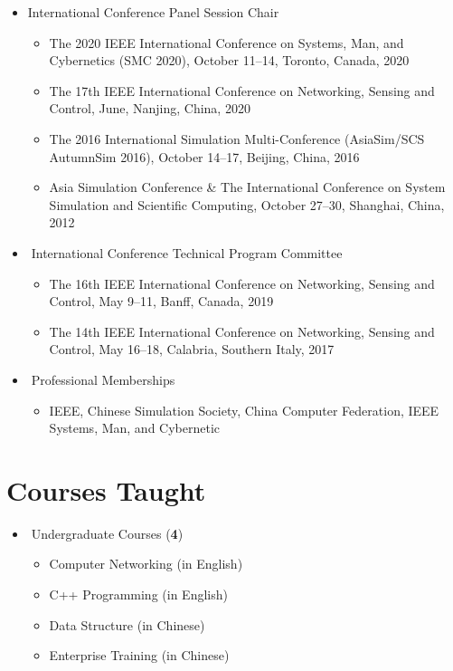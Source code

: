 \documentclass[margin,line]{res}
\begin{document}
\begin{resume}
\begin{itemize}
	\item International Conference Panel Session Chair
	\begin{itemize}
		\item The 2020 IEEE International Conference on Systems, Man, and Cybernetics (SMC 2020), October 11--14, Toronto, Canada, 2020
		\item The 17th IEEE International Conference on Networking, Sensing and Control, June, Nanjing, China, 2020
		\item The 2016 International Simulation Multi-Conference (AsiaSim/SCS AutumnSim 2016), October 14--17, Beijing, China, 2016
		\item Asia Simulation Conference \& The International Conference on System Simulation and Scientific Computing, October 27--30, Shanghai, China, 2012
	\end{itemize}
\end{itemize}

\begin{itemize}
	\item International Conference Technical Program Committee
	\begin{itemize}
		\item The 16th IEEE International Conference on Networking, Sensing and Control, May 9--11, Banff, Canada, 2019
		\item The 14th IEEE International Conference on Networking, Sensing and Control, May 16--18, Calabria, Southern Italy, 2017
	\end{itemize}
\end{itemize}

\begin{itemize}
	\item Professional Memberships
	\begin{itemize}
		\item IEEE, Chinese Simulation Society, China Computer Federation, IEEE Systems, Man, and Cybernetic
	\end{itemize}
\end{itemize}

\section{\sc Courses Taught}
\begin{itemize}
	\item Undergraduate Courses (\textbf{4})
	\begin{itemize}
		\item Computer Networking (in English)
		\item C++ Programming (in English)
		\item Data Structure (in Chinese)
		\item Enterprise Training (in Chinese)
	\end{itemize}
\end{itemize}


\end{resume}
\end{document}
